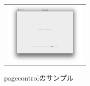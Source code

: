 \begin{figure}[htbp]
  \begin{center}
    \begin{tabular}{c}

      \begin{minipage}{0.33\hsize}
        \begin{center}
\includegraphics[width=4cm, bb=0 0 640 480]{pagecontrol.png}
        \end{center}
      \end{minipage}

    \end{tabular}
    \caption{pagecontrolのサンプル}
    \label{fig:lena}
  \end{center}
\end{figure}

